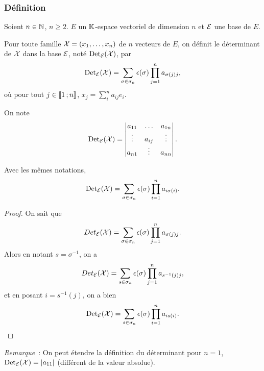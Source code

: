 \subsubsection{Définition}

Soient \(n \in \mathbb{N}\), \(n\geqslant 2\). \(E\) un \(\mathbb{K}\)-espace vectoriel de 
dimension \(n\) et \(\mathcal{E}\) une base de \(E\).
\begin{defdef}
  Pour toute famille \(\mathcal{X}=(x_1, \ldots, x_n)\) de \(n\) vecteurs de \(E\), on 
  définit le déterminant de \(\mathcal{X}\) dans la base \(\mathcal{E}\), noté \(\operatorname{Det}_{\mathcal{E}}(\mathcal{X})\), 
  par
  \begin{equation}
    \operatorname{Det}_{\mathcal{E}}(\mathcal{X}) = \sum_{\sigma \in \sigma_n}\epsilon(\sigma) \prod_{j=1}^n 
    a_{\sigma(j)j},
  \end{equation}
  où pour tout \(j \in \mathopen{\llbracket}1\mathclose{}\mathpunct{};n\mathclose{\rrbracket}\), \(x_j=\sum_{i}^n a_{ij}e_i\).
\end{defdef}
On note \begin{equation}
  \operatorname{Det}_{\mathcal{E}}(\mathcal{X}) = \begin{vmatrix} a_{11} & \ldots & a_{1n} \\ \vdots & a_{ij} & 
  \vdots \\ a_{n1} & \vdots & a_{nn}\end{vmatrix}.
\end{equation}
%
\begin{prop}
  Avec les mêmes notations,
  \begin{equation}
    \operatorname{Det}_{\mathcal{E}}(\mathcal{X}) = \sum_{\sigma \in \sigma_n}\epsilon(\sigma) \prod_{i=1}^n 
    a_{i\sigma(i)}.
  \end{equation}
\end{prop}
\begin{proof}
  On sait que
  \begin{equation}
    Det_{\mathcal{E}}(\mathcal{X}) = \sum_{\sigma \in \sigma_n}\epsilon(\sigma) \prod_{j=1}^n 
    a_{\sigma(j)j}.
  \end{equation}
  Alors en notant \(s=\sigma^{-1}\), on a
  \begin{equation}
    Det_{\mathcal{E}}(\mathcal{X}) = \sum_{s \in \sigma_n}\epsilon(\sigma) \prod_{j=1}^n 
    a_{s^{-1}(j)j},
  \end{equation}
  et en posant \(i=s^{-1}(j)\), on a bien
  \begin{equation}
    \operatorname{Det}_{\mathcal{E}}(\mathcal{X}) = \sum_{s \in \sigma_n}\epsilon(\sigma) \prod_{i=1}^n a_{is(i)}.
  \end{equation}
\end{proof}

\emph{Remarque}~: On peut étendre la définition du déterminant pour \(n=1\), 
\(\operatorname{Det}_{\mathcal{E}}(\mathcal{X}) = \left\lvert a_{11}\right\rvert\) (\danger différent de la valeur absolue).

